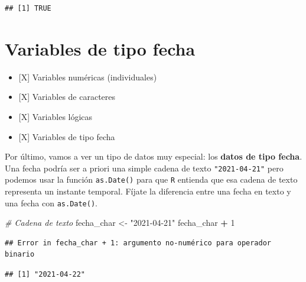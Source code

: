 \documentclass[11pt,]{book}
\newenvironment{Shaded}{\begin{snugshade}}{\end{snugshade}}
\newcommand{\CommentTok}[1]{\textcolor[rgb]{0.37,0.37,0.37}{\textit{#1}}}
\newcommand{\DataTypeTok}[1]{\textcolor[rgb]{0.27,0.27,0.27}{#1}}
\newcommand{\DecValTok}[1]{\textcolor[rgb]{0.06,0.06,0.06}{#1}}
\newcommand{\KeywordTok}[1]{\textcolor[rgb]{0.27,0.27,0.27}{\textbf{#1}}}
\newcommand{\NormalTok}[1]{#1}
\newcommand{\OperatorTok}[1]{\textcolor[rgb]{0.43,0.43,0.43}{\textbf{#1}}}
\newcommand{\StringTok}[1]{\textcolor[rgb]{0.5,0.5,0.5}{#1}}
\providecommand{\tightlist}{%
  \setlength{\itemsep}{0pt}\setlength{\parskip}{0pt}}
\begin{document}
\begin{verbatim}
## [1] TRUE
\end{verbatim}

\hypertarget{fechas}{%
\section{Variables de tipo fecha}\label{fechas}}

\begin{itemize}
\tightlist
\item
  {[}X{]} Variables numéricas (individuales)
\item
  {[}X{]} Variables de caracteres
\item
  {[}X{]} Variables lógicas
\item
  {[}X{]} Variables de tipo fecha
\end{itemize}

Por último, vamos a ver un tipo de datos muy especial: los \textbf{datos de tipo fecha}. Una fecha podría ser a priori una simple cadena de texto \texttt{"2021-04-21"} pero podemos usar la función \texttt{as.Date()} para que \texttt{R} entienda que esa cadena de texto representa un instante temporal. Fíjate la diferencia entre una fecha en texto y una fecha con \texttt{as.Date()}.

\begin{Shaded}
\begin{Highlighting}[]
\CommentTok{# Cadena de texto}
\NormalTok{fecha_char <-}\StringTok{ "2021-04-21"}
\NormalTok{fecha_char }\OperatorTok{+}\StringTok{ }\DecValTok{1}
\end{Highlighting}
\end{Shaded}

\begin{verbatim}
## Error in fecha_char + 1: argumento no-numérico para operador binario
\end{verbatim}

\begin{Shaded}
\end{Shaded}

\begin{verbatim}
## [1] "2021-04-22"
\end{verbatim}
\end{document}
